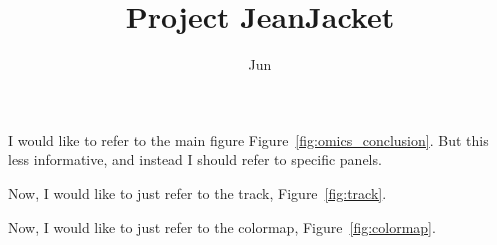 \documentclass[onecolumn,11pt]{article}
\title{Project JeanJacket}
\author[a]{Jun}
\affil[a]{University of California Irvine}
\date{} %
\begin{document}
\maketitle




\processinternalcaption





\clearpage





I would like to refer to the main figure Figure~\ref{fig:omics_conclusion}. But this less informative, and instead I should refer to specific panels.

Now, I would like to just refer to the track, Figure~\ref{fig:track}.

Now, I would like to just refer to the colormap, Figure~\ref{fig:colormap}.



\clearpage
\end{document}
